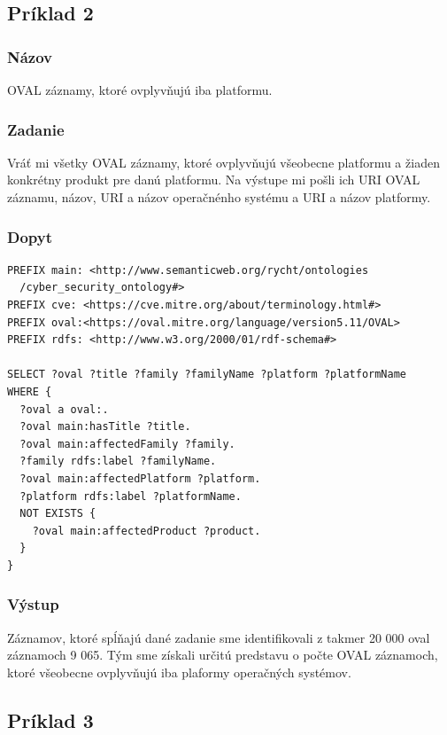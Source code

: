 \documentclass[12pt, a4paper, oneside]{book}
\begin{document}
\subsection*{Príklad 2}
\label{sec:priklad2}
\subsubsection*{Názov}
OVAL záznamy, ktoré ovplyvňujú iba platformu.

\subsubsection*{Zadanie}
Vráť mi všetky OVAL záznamy, ktoré ovplyvňujú všeobecne platformu a žiaden konkrétny produkt pre danú platformu. Na výstupe mi pošli ich URI OVAL záznamu, názov, URI a názov operačnénho systému a URI a názov platformy.

\subsubsection*{Dopyt}
\begin{small}
\begin{verbatim}
PREFIX main: <http://www.semanticweb.org/rycht/ontologies
  /cyber_security_ontology#>
PREFIX cve: <https://cve.mitre.org/about/terminology.html#>
PREFIX oval:<https://oval.mitre.org/language/version5.11/OVAL>
PREFIX rdfs: <http://www.w3.org/2000/01/rdf-schema#>

SELECT ?oval ?title ?family ?familyName ?platform ?platformName
WHERE {
  ?oval a oval:.
  ?oval main:hasTitle ?title.
  ?oval main:affectedFamily ?family.
  ?family rdfs:label ?familyName.
  ?oval main:affectedPlatform ?platform.
  ?platform rdfs:label ?platformName.
  NOT EXISTS {
    ?oval main:affectedProduct ?product.
  }
}
\end{verbatim}
\end{small}

\subsubsection*{Výstup}
Záznamov, ktoré spĺňajú dané zadanie sme identifikovali z takmer 20 000 oval záznamoch 9 065. Tým sme získali určitú predstavu o počte OVAL záznamoch, ktoré všeobecne ovplyvňujú iba plaformy operačných systémov.


\subsection*{Príklad 3}
\label{sec:priklad3}
\end{document}
